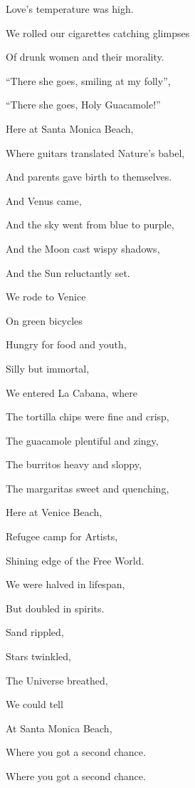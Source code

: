 \documentclass{article}
\begin{document}
Love's temperature was high.

We rolled our cigarettes catching glimpses 

Of drunk women and their morality.

``There she goes, smiling at my folly'',

``There she goes, Holy Guacamole!''

Here at Santa Monica Beach,

Where guitars translated Nature's babel,

And parents gave birth to themselves.

\newline \newline

And Venus came,

And the sky went from blue to purple,

And the Moon cast wispy shadows,

And the Sun reluctantly set.

We rode to Venice

On green bicycles

Hungry for food and youth,

Silly but immortal,

We entered La Cabana, where

The tortilla chips were fine and crisp,

The guacamole plentiful and zingy,

The burritos heavy and sloppy,

The margaritas sweet and quenching,

Here at Venice Beach,

Refugee camp for Artists,

Shining edge of the Free World.

\newline \newline

We were halved in lifespan,

But doubled in spirits.

Sand rippled,

Stars twinkled,

The Universe breathed,

We could tell

At Santa Monica Beach,

Where you got a second chance.

Where you got a second chance.
\end{document}
